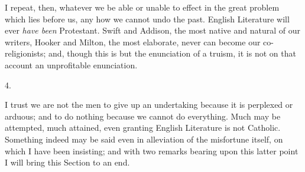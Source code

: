 I repeat, then, whatever we be able or unable to effect in the
great problem which lies before us, any how we cannot undo the past.
English Literature will ever \emph{have been} Protestant. Swift and Addison,
the most native and natural of our writers, Hooker and Milton, the
most elaborate, never can become our co-religionists; and, though this
is but the enunciation of a truism, it is not on that account an
unprofitable enunciation.

4.

I trust we are not the men to give up an undertaking because it is
perplexed or arduous; and to do nothing because we cannot do
everything. Much may be attempted, much attained, even granting
English Literature is not Catholic. Something indeed may be said even
in alleviation of the misfortune itself, on which I have been
insisting; and with two remarks bearing upon this latter point I will
bring this Section to an end.

